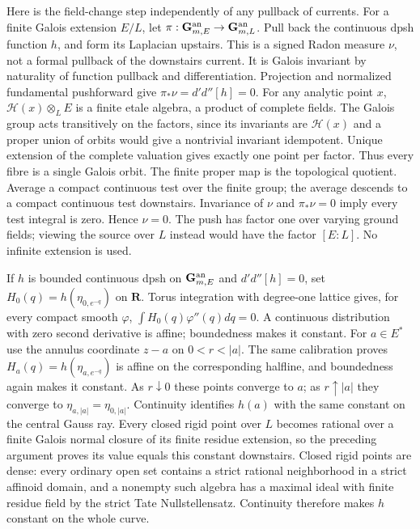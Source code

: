 \documentclass[11pt]{article}
\begin{document}
Here is the field-change step independently of any pullback of currents.
For a finite Galois extension $E/L$, let $\pi:\mathbf G_{m,E}^{\rm an}
\to\mathbf G_{m,L}^{\rm an}$. Pull back the continuous dpsh function $h$,
and form its Laplacian upstairs. This is a signed Radon measure $\nu$,
not a formal pullback of the downstairs current. It is Galois invariant by
naturality of function pullback and differentiation. Projection and normalized
fundamental pushforward give $\pi_*\nu=d'd''[h]=0$.
For any analytic point $x$, $\mathcal H(x)\otimes_LE$ is a finite etale
algebra, a product of complete fields. The Galois group acts transitively
on the factors, since its invariants are $\mathcal H(x)$ and a proper union
of orbits would give a nontrivial invariant idempotent. Unique extension of
the complete valuation gives exactly one point per factor. Thus every fibre
is a single Galois orbit. The finite proper map is the topological quotient.
Average a compact continuous test over the finite group; the average descends
to a compact continuous test downstairs. Invariance of $\nu$ and
$\pi_*\nu=0$ imply every test integral is zero. Hence $\nu=0$.
The push has factor one over varying ground fields; viewing the source over
$L$ instead would have the factor $[E:L]$. No infinite extension is used.

If $h$ is bounded continuous dpsh on $\mathbf G_{m,E}^{\rm an}$ and
$d'd''[h]=0$, set $H_0(q)=h(\eta_{0,e^{-q}})$ on $\mathbf R$.
Torus integration with degree-one lattice gives, for every compact smooth
$\varphi$, $\int H_0(q)\varphi''(q)dq=0$.
A continuous distribution with zero second derivative is affine; boundedness
makes it constant. For $a\in E^*$ use the annulus coordinate $z-a$ on
$0<r<|a|$. The same calibration proves
$H_a(q)=h(\eta_{a,e^{-q}})$ is affine on the corresponding halfline,
and boundedness again makes it constant. As $r\downarrow0$ these points
converge to $a$; as $r\uparrow|a|$ they converge to
$\eta_{a,|a|}=\eta_{0,|a|}$. Continuity identifies $h(a)$ with the same
constant on the central Gauss ray.
Every closed rigid point over $L$ becomes rational over a finite Galois normal
closure of its finite residue extension, so the preceding argument proves
its value equals this constant downstairs. Closed rigid points are dense:
every ordinary open set contains a strict rational neighborhood in a strict
affinoid domain, and a nonempty such algebra has a maximal ideal with finite
residue field by the strict Tate Nullstellensatz. Continuity therefore makes
$h$ constant on the whole curve.
\end{document}
